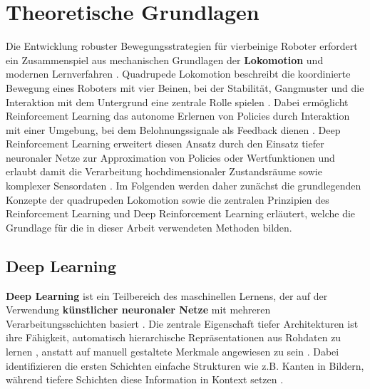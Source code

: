 \chapter{Theoretische Grundlagen}\label{ch:theoretical_foundation} 
Die Entwicklung robuster Bewegungsstrategien für vierbeinige Roboter erfordert ein Zusammenspiel aus mechanischen Grundlagen der \textbf{Lokomotion} und modernen Lernverfahren \cite{hwangboLearningAgileDynamic2019, hutterANYmalHighlyMobile2016}. Quadrupede Lokomotion beschreibt die koordinierte Bewegung eines Roboters mit vier Beinen, bei der Stabilität, Gangmuster und die Interaktion mit dem Untergrund eine zentrale Rolle spielen \cite{hwangboLearningAgileDynamic2019, hutterANYmalHighlyMobile2016}. Dabei ermöglicht Reinforcement Learning das autonome Erlernen von Policies durch Interaktion mit einer Umgebung, bei dem Belohnungssignale als Feedback dienen \cite{silverRewardEnough2021, zhangORSOAcceleratingReward2025, Kober_IJRR_2013}. Deep Reinforcement Learning erweitert diesen Ansatz durch den Einsatz tiefer neuronaler Netze zur Approximation von Policies oder Wertfunktionen und erlaubt damit die Verarbeitung hochdimensionaler Zustandsräume sowie komplexer Sensordaten \cite{rudin2022learningwalkminutesusing, tangDeepReinforcementLearning2024, cobbe2019quantifyinggeneralizationreinforcementlearning}. Im Folgenden werden daher zunächst die grundlegenden Konzepte der quadrupeden Lokomotion sowie die zentralen Prinzipien des Reinforcement Learning und Deep Reinforcement Learning erläutert, welche die Grundlage für die in dieser Arbeit verwendeten Methoden bilden.
\section{Deep Learning}
\label{dl_explain}
\textbf{Deep Learning} ist ein Teilbereich des maschinellen Lernens, der auf der Verwendung \textbf{künstlicher neuronaler Netze} mit mehreren Verarbeitungsschichten basiert \cite{Goodfellow-et-al-2016, francois-lavetIntroductionDeepReinforcement2018}. Die zentrale Eigenschaft tiefer Architekturen ist ihre Fähigkeit, automatisch hierarchische Repräsentationen aus Rohdaten zu lernen \cite{francois-lavetIntroductionDeepReinforcement2018}, anstatt auf manuell gestaltete Merkmale angewiesen zu sein \cite{Goodfellow-et-al-2016}. Dabei identifizieren die ersten Schichten einfache Strukturen wie z.B. Kanten in Bildern, während tiefere Schichten diese Information in Kontext setzen \cite{Goodfellow-et-al-2016}. 
